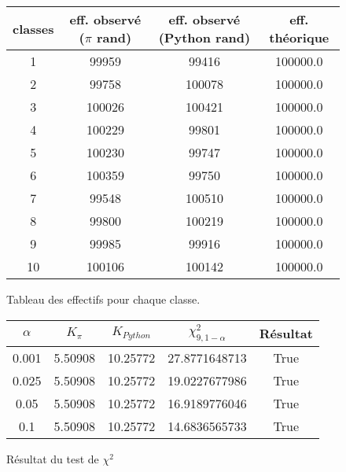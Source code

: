 
\begin{figure}[H]
\begin{center}
\begin{longtable}{|c|c|c|c|}
\hline
classes & eff. observé ($\pi$ rand) & eff. observé (Python rand) & eff. théorique\\
\hline
1 & 99959 & 99416 & 100000.0\\
2 & 99758 & 100078 & 100000.0\\
3 & 100026 & 100421 & 100000.0\\
4 & 100229 & 99801 & 100000.0\\
5 & 100230 & 99747 & 100000.0\\
6 & 100359 & 99750 & 100000.0\\
7 & 99548 & 100510 & 100000.0\\
8 & 99800 & 100219 & 100000.0\\
9 & 99985 & 99916 & 100000.0\\
10 & 100106 & 100142 & 100000.0\\
\hline
\end{longtable}
\end{center}
\caption{Tableau des effectifs pour chaque classe.}
\end{figure}
\begin{figure}[H]
\begin{center}
\begin{tabular}{|c|c|c|c|c|}
\hline
$\alpha$ & $K_{\pi}$ & $K_{Python}$ & $\chi^2_{9, 1 - \alpha}$ & Résultat\\
\hline
0.001 & 5.50908 & 10.25772 & 27.8771648713 & True\\
0.025 & 5.50908 & 10.25772 & 19.0227677986 & True\\
0.05 & 5.50908 & 10.25772 & 16.9189776046 & True\\
0.1 & 5.50908 & 10.25772 & 14.6836565733 & True\\
\hline
\end{tabular}
\end{center}
\caption{Résultat du test de $\chi^2$}
\end{figure}



